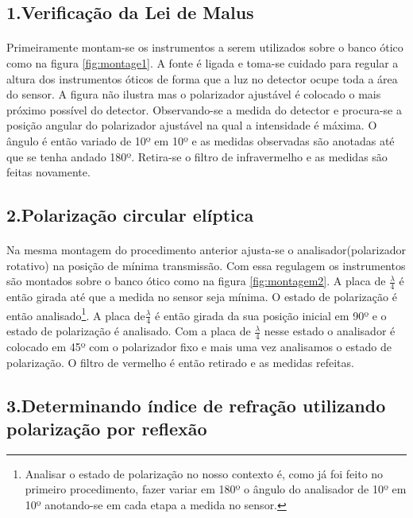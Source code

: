 \documentclass[a4paper,11pt]{article}
\begin{document}
	\subsection*{1.Verificação da Lei de Malus}
		\paragraph{}Primeiramente montam-se os instrumentos a serem utilizados sobre o banco ótico como na figura \ref{fig:montage1}. A fonte é ligada e toma-se cuidado para regular a altura dos instrumentos óticos de forma que a luz no detector ocupe toda a área do sensor. A figura não ilustra mas o polarizador ajustável é colocado o mais próximo possível do detector. Observando-se a medida do detector e procura-se a posição angular do polarizador ajustável na qual a intensidade é máxima. O ângulo é então variado de 10º em 10º e as medidas observadas são anotadas até que se tenha andado 180º. Retira-se o filtro de infravermelho e as medidas são feitas novamente.
		
	\subsection*{2.Polarização circular elíptica}
		\paragraph{}Na mesma montagem do procedimento anterior ajusta-se o analisador(polarizador rotativo) na posição de mínima transmissão. Com essa regulagem os instrumentos são montados sobre o banco ótico como na figura \ref{fig:montagem2}. A placa de $\frac{\lambda}{4}$ é então girada até que a medida no sensor seja mínima. O estado de polarização é então analisado\footnote{Analisar o estado de polarização no nosso contexto é, como já foi feito no primeiro procedimento, fazer variar em 180º o ângulo do analisador de 10º em 10º anotando-se em cada etapa a medida no sensor.}. A placa de$\frac{\lambda}{4}$ é então girada da sua posição inicial em 90º e o estado de polarização é analisado. Com a placa de $\frac{\lambda}{4}$ nesse estado o analisador é colocado em 45º com o polarizador fixo e mais uma vez analisamos o estado de polarização. O filtro de vermelho é então retirado e as medidas refeitas.  
		
		
	\subsection*{3.Determinando índice de refração utilizando polarização por reflexão}
\end{document}
